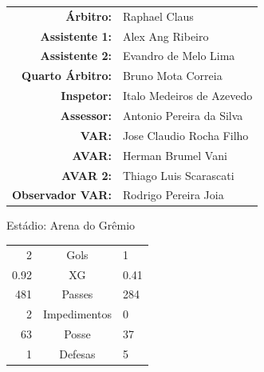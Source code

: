 \documentclass[11pt]{article}
\newcommand{\teamjersey}{}
\begin{document}
\vspace{0.5cm}
\begin{minipage}{0.65\textwidth}
\begin{center}
\begin{tabular}{rl}
\textbf{Árbitro:} & Raphael Claus \\
\textbf{Assistente 1:} & Alex Ang Ribeiro \\
\textbf{Assistente 2:} & Evandro de Melo Lima \\
\textbf{Quarto Árbitro:} & Bruno Mota Correia \\
\textbf{Inspetor:} & Italo Medeiros de Azevedo \\
\textbf{Assessor:} & Antonio Pereira da Silva \\
\textbf{VAR:} & Jose Claudio Rocha Filho \\
\textbf{AVAR:} & Herman Brumel Vani \\
\textbf{AVAR 2:} & Thiago Luis Scarascati \\
\textbf{Observador VAR:} & Rodrigo Pereira Joia \\
\end{tabular}
\end{center}
\end{minipage}
\begin{minipage}{0.3\textwidth}
Estádio: Arena do Grêmio\\
\begin{tabular}{rcl}
2 & Gols & 1 \\
0.92 & XG & 0.41 \\
481 & Passes & 284 \\
2 & Impedimentos & 0 \\
63 & Posse & 37 \\
1 & Defesas & 5 \\
\end{tabular}
\end{minipage}
\newpage
\vspace{0.5cm}
\renewcommand{\teamjersey}{../assets/camisa/costas1.png}
\end{document}

